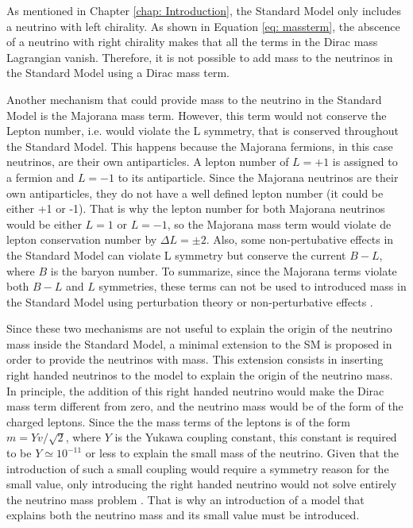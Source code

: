 As mentioned in Chapter \ref{chap: Introduction}, the Standard Model only includes a neutrino with left chirality. As shown in Equation \ref{eq: massterm}, the abscence of a neutrino with right chirality makes that all the terms in the Dirac mass Lagrangian vanish. Therefore, it is not possible to add mass to the neutrinos in the Standard Model using a Dirac mass term.

Another mechanism that could provide mass to the neutrino in the Standard Model is the Majorana mass term. However, this term would not conserve the Lepton number, i.e. would violate the L symmetry, that is conserved throughout the Standard Model\cite{NeutrinoMass2}. This happens because the Majorana fermions, in this case neutrinos, are their own antiparticles. A lepton number of $L = +1$ is assigned to a fermion and $L = -1$ to its antiparticle. Since the Majorana neutrinos are their own antiparticles, they do not have a well defined lepton number (it could be either +1 or -1). That is why the lepton number for both Majorana neutrinos would be either $L = 1$ or $L = -1$, so the Majorana mass term would violate de lepton conservation number by $\Delta L = \pm 2$. Also, some non-pertubative effects in the Standard Model can violate L symmetry but conserve the current $B - L$, where $B$ is the baryon number. To summarize, since the Majorana terms violate both $B-L$ and $L$ symmetries, these terms can not be used to introduced mass in the Standard Model using perturbation theory or non-perturbative effects \cite{NeutrinoMass2}.  

Since these two mechanisms are not useful to explain the origin of the neutrino mass inside the Standard Model, a minimal extension to the SM is proposed in order to provide the neutrinos with mass. This extension consists in inserting right handed neutrinos to the model to explain the origin of the neutrino mass. In principle, the addition of this right handed neutrino would make the Dirac mass term different from zero, and the neutrino mass would be of the form of the charged leptons. Since the the mass terms of the leptons is of the form $m = Yv/\sqrt{2}$, where $Y$ is the Yukawa coupling constant, this constant is required to be $Y \simeq 10^{-11}$ or less to explain the small mass of the neutrino. Given that the introduction of such a small coupling would require a symmetry reason for the small value, only introducing the right handed neutrino would not solve entirely the neutrino mass problem \cite{YukawaCoupling}. That is why an introduction of a model that explains both the neutrino mass and its small value must be introduced.


